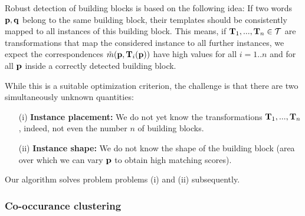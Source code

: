 \documentclass{acmtog}
\begin{document}
Robust detection of building blocks is based on the following idea: If two words $\mathbf{p},\mathbf{q}$ belong to the same building block, their templates should be consistently mapped to all instances of this building block. This means, if $\mathbf{T}_1,...,\mathbf{T}_n \in \mathcal{T}$ are transformations that map the considered instance to all further instances, we expect the correspondences $\tilde{m}(\mathbf{p}, \mathbf{T}_i(\mathbf{p}))$ have high values for all $i=1..n$ and for all $\mathbf{p}$ inside a correctly detected building block. 

While this is a suitable optimization criterion, the challenge is that there are two simultaneously unknown quantities:
\begin{enumerate}
	\item[(i)] \textbf{Instance placement:} We do not yet know the transformations $\mathbf{T}_1,...,\mathbf{T}_n$, indeed, not even the number $n$ of building blocks.
	\item[(ii)] \textbf{Instance shape:} We do not know the shape of the building block (area over which we can vary $\mathbf{p}$ to obtain high matching scores).
\end{enumerate}
 
Our algorithm solves problem problems (i) and (ii) subsequently.

\subsubsection{Co-occurance clustering}
\end{document}
